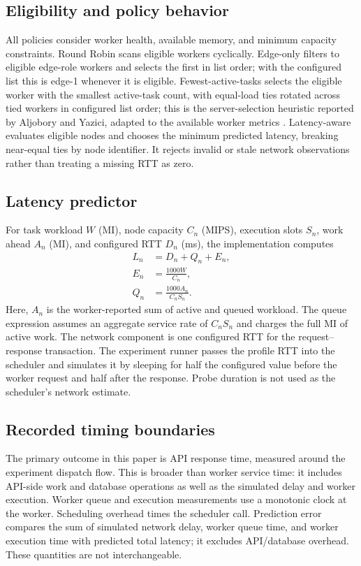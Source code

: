 \documentclass[conference]{IEEEtran}
\begin{document}
        \subsection{Eligibility and policy behavior}
        All policies consider worker health, available memory, and minimum capacity constraints. Round Robin scans eligible workers cyclically. Edge-only filters to eligible edge-role workers and selects the first in list order; with the configured list this is edge-1 whenever it is eligible. Fewest-active-tasks selects the eligible worker with the smallest active-task count, with equal-load ties rotated across tied workers in configured list order; this is the server-selection heuristic reported by Aljobory and Yazici, adapted to the available worker metrics \cite{ma_offload}. Latency-aware evaluates eligible nodes and chooses the minimum predicted latency, breaking near-equal ties by node identifier. It rejects invalid or stale network observations rather than treating a missing RTT as zero.

        \subsection{Latency predictor}
        For task workload $W$ (MI), node capacity $C_n$ (MIPS), execution slots $S_n$, work ahead $A_n$ (MI), and configured RTT $D_n$ (ms), the implementation computes
        \begin{align}
        L_n &= D_n + Q_n + E_n, \\
        E_n &= \frac{1000W}{C_n}, \\
        Q_n &= \frac{1000A_n}{C_nS_n}.
        \end{align}
        Here, $A_n$ is the worker-reported sum of active and queued workload. The queue expression assumes an aggregate service rate of $C_nS_n$ and charges the full MI of active work. The network component is one configured RTT for the request--response transaction. The experiment runner passes the profile RTT into the scheduler and simulates it by sleeping for half the configured value before the worker request and half after the response. Probe duration is not used as the scheduler's network estimate.

        \subsection{Recorded timing boundaries}
        The primary outcome in this paper is API response time, measured around the experiment dispatch flow. This is broader than worker service time: it includes API-side work and database operations as well as the simulated delay and worker execution. Worker queue and execution measurements use a monotonic clock at the worker. Scheduling overhead times the scheduler call. Prediction error compares the sum of simulated network delay, worker queue time, and worker execution time with predicted total latency; it excludes API/database overhead. These quantities are not interchangeable.
\end{document}
